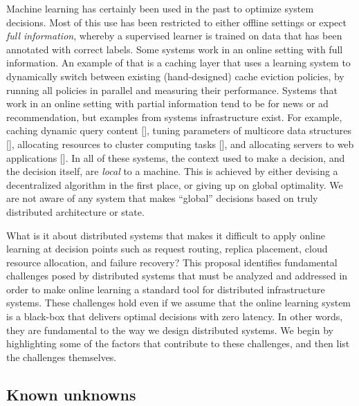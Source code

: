 \documentclass[a4paper,twocolumn]{article}
\begin{document}
Machine learning has certainly been used in the past to optimize system
decisions. Most of this use has been restricted to either offline settings or
expect {\em full information}, whereby a supervised learner is trained on data
that has been annotated with correct labels.
Some systems work in an online setting with full information. An example of that
is a caching layer that uses a learning system to dynamically switch between
existing (hand-designed) cache eviction policies, by running all policies in
parallel and measuring their performance.
Systems that work in an online setting with partial information
tend to be for news or ad recommendation, but examples from systems
infrastructure exist. For example, caching dynamic query content [], tuning
parameters of multicore data structures [], allocating resources to cluster
computing tasks [], and allocating servers to web applications [].  In all of
these systems, the context used to make a decision, and the decision itself, are
{\em local} to a machine. This is achieved by either devising a decentralized
algorithm in the first place, or giving up on global optimality. We are not
aware of any system that makes ``global'' decisions based on truly distributed
architecture or state.


What is it about distributed systems that makes it difficult to apply online
learning at decision points such as request routing, replica placement, cloud
resource allocation, and failure recovery? This proposal identifies fundamental
challenges posed by distributed systems that must be analyzed and addressed in
order to make online learning a standard tool for distributed infrastructure
systems.  These challenges hold even if we assume that the online learning
system is a black-box that delivers optimal decisions with zero latency. In
other words, they are fundamental to the way we design distributed systems.  We
begin by highlighting some of the factors that contribute to these challenges,
and then list the challenges themselves.

\subsection*{Known unknowns}
\end{document}
